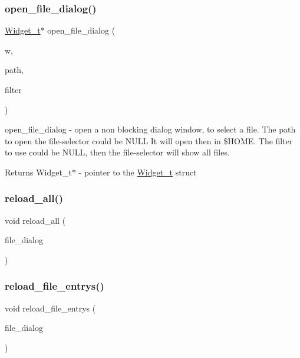 \subsubsection{\texorpdfstring{open\+\_\+file\+\_\+dialog()}{open\_file\_dialog()}}
{\footnotesize\ttfamily \hyperlink{structWidget__t}{Widget\+\_\+t}$\ast$ open\+\_\+file\+\_\+dialog (\begin{DoxyParamCaption}\item[{\hyperlink{structWidget__t}{Widget\+\_\+t} $\ast$}]{w,  }\item[{const char $\ast$}]{path,  }\item[{const char $\ast$}]{filter }\end{DoxyParamCaption})}



open\+\_\+file\+\_\+dialog -\/ open a non blocking dialog window, to select a file. The path to open the file-\/selector could be N\+U\+LL It will open then in \$\+H\+O\+ME. The filter to use could be N\+U\+LL, then the file-\/selector will show all files. 

\begin{DoxyReturn}{Returns}
Widget\+\_\+t$\ast$ -\/ pointer to the \hyperlink{structWidget__t}{Widget\+\_\+t} struct 
\end{DoxyReturn}
\mbox{\label{xfile-dialog_8c_ad0abc7fe3e910dc3b819722fc6e76631}} 
\subsubsection{\texorpdfstring{reload\+\_\+all()}{reload\_all()}}
{\footnotesize\ttfamily void reload\+\_\+all (\begin{DoxyParamCaption}\item[{\hyperlink{structFileDialog}{File\+Dialog} $\ast$}]{file\+\_\+dialog }\end{DoxyParamCaption})}

\mbox{\label{xfile-dialog_8c_ad0362abb358fc6b16f5a8b3db022cd57}} 
\subsubsection{\texorpdfstring{reload\+\_\+file\+\_\+entrys()}{reload\_file\_entrys()}}
{\footnotesize\ttfamily void reload\+\_\+file\+\_\+entrys (\begin{DoxyParamCaption}\item[{\hyperlink{structFileDialog}{File\+Dialog} $\ast$}]{file\+\_\+dialog }\end{DoxyParamCaption})}

